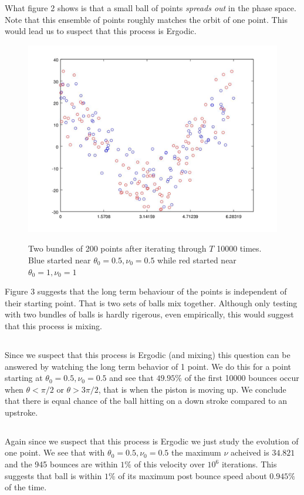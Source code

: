 \documentclass{unswmaths}
\begin{document}
What figure 2 shows is that a small ball of points \emph{spreads out} in the phase space. Note that this ensemble of points roughly matches the orbit of one point. This would lead us to suspect that this process is Ergodic. 

\clearpage
\begin{figure}[h]
    \includegraphics[scale=0.5]{Question_6_Mixing}
    \label{qn_6_mixing}
    \caption{Two bundles of 200 points after iterating through  $ T $ 10000 times. Blue started near $ \theta_0 = 0.5, \nu_0 = 0.5 $ while red started near $ \theta_0 = 1, \nu_0 = 1 $ }
\end{figure}


Figure 3 suggests that the long term behaviour of the  points is independent of their starting point. That is two sets of balls mix together. Although only testing with two bundles of balls is hardly rigerous, even empirically, this would suggest that this process is mixing.
\subsection{}
Since we suspect that this process is Ergodic (and mixing) this question can be answered by watching the long term behavior of 1 point. We do this for a point starting at $ \theta_0 = 0.5, \nu_0 = 0.5 $ and see that $ 49.95 \% $ of the first 10000 bounces occur when $ \theta < \pi / 2 $ or $ \theta > 3\pi / 2 $, that is when the piston is moving up. We conclude that there is equal chance of the ball hitting on a down stroke compared to an upstroke.

\subsection{}
Again since we suspect that this process is Ergodic we just study the evolution of one point.
We see that with $ \theta_0 = 0.5, \nu_0 = 0.5 $ the maximum $ \nu $ acheived is $ 34.821 $ and the 945 bounces are within $ 1\%$ of this velocity over $ 10^6 $ iterations. This suggests that ball is within $ 1\%$ of its maximum post bounce speed about $ 0.945\% $ of the time. 
\end{document}

